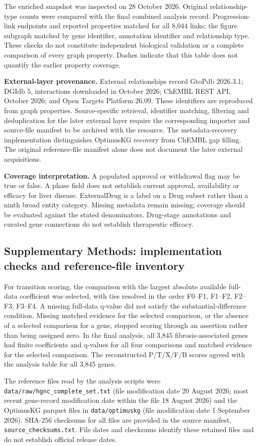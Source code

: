 \documentclass[11pt,a4paper]{article}
\begin{document}
\small
The enriched snapshot was inspected on 28 October 2026. Original relationship-type counts were compared with the final combined analysis record. Progression-link endpoints and reported properties matched for all 8,044 links; the figure subgraph matched by gene identifier, annotation identifier and relationship type. These checks do not constitute independent biological validation or a complete comparison of every graph property. Dashes indicate that this table does not quantify the earlier property coverage.

\textbf{External-layer provenance.} External relationships record GtoPdb 2026.3.1; DGIdb 5, interactions downloaded in October 2026; ChEMBL REST API, October 2026; and Open Targets Platform 26.09. These identifiers are reproduced from graph properties. Source-specific retrieval, identifier matching, filtering and deduplication for the later external layer require the corresponding importer and source-file manifest to be archived with the resource. The metadata-recovery implementation distinguishes OptimusKG recovery from ChEMBL gap filling. The original reference-file manifest alone does not document the later external acquisitions.

\textbf{Coverage interpretation.} A populated approval or withdrawal flag may be true or false. A phase field does not establish current approval, availability or efficacy for liver disease. ExternalDrug is a label on a Drug subset rather than a ninth broad entity category. Missing metadata remain missing; coverage should be evaluated against the stated denominators. Drug-stage annotations and curated gene connections do not establish therapeutic efficacy.
\endgroup

\subsection*{Supplementary Methods: implementation checks and reference-file inventory}
For transition scoring, the comparison with the largest absolute available full-data coefficient was selected, with ties resolved in the order F0--F1, F1--F2, F2--F3, F3--F4. A missing full-data q-value did not satisfy the substantial-difference condition. Missing matched evidence for the selected comparison, or the absence of a selected comparison for a gene, stopped scoring through an assertion rather than being assigned zero. In the final analysis, all 3,845 fibrosis-associated genes had finite coefficients and q-values for all four comparisons and matched evidence for the selected comparison. The reconstructed P/T/X/F/B scores agreed with the analysis table for all 3,845 genes.

The reference files read by the analysis scripts were \nolinkurl{data/raw/hgnc_complete_set.txt} (file modification date 20 August 2026; most recent gene-record modification date within the file 18 August 2026) and the OptimusKG parquet files in \nolinkurl{data/optimuskg} (file modification date 1 September 2026). SHA-256 checksums for all files are provided in the source manifest, \nolinkurl{source_checksums.txt}. File dates and checksums identify these retained files and do not establish official release dates.
\end{document}
